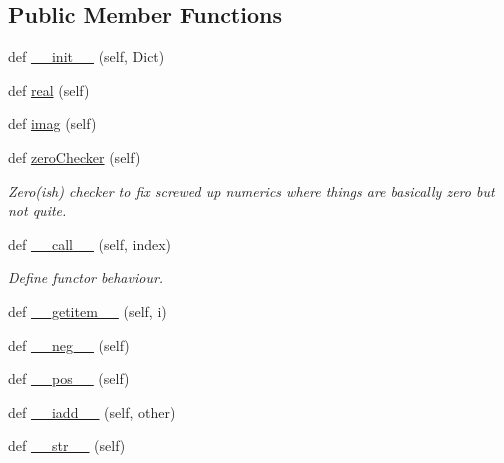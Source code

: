 \subsection*{Public Member Functions}
\begin{DoxyCompactItemize}
\item 
def \hyperlink{class_py_spinor_1_1pol_dictionary_1_1pol_dictionary_aa591099c2d162baef26e4c3a0f1d953e}{\+\_\+\+\_\+init\+\_\+\+\_\+} (self, Dict)
\item 
def \hyperlink{class_py_spinor_1_1pol_dictionary_1_1pol_dictionary_a42794ddf8460d756c5431d6700e7123b}{real} (self)
\item 
def \hyperlink{class_py_spinor_1_1pol_dictionary_1_1pol_dictionary_a704983b1069c410cebb66b83f5449c07}{imag} (self)
\item 
def \hyperlink{class_py_spinor_1_1pol_dictionary_1_1pol_dictionary_a892916dbb6cc54e0c365903e37abf3a9}{zero\+Checker} (self)
\begin{DoxyCompactList}\small\item\em Zero(ish) checker to fix screwed up numerics where things are basically zero but not quite. \end{DoxyCompactList}\item 
def \hyperlink{class_py_spinor_1_1pol_dictionary_1_1pol_dictionary_adccb979d3dcd442690a49ad3ba6e4e23}{\+\_\+\+\_\+call\+\_\+\+\_\+} (self, index)
\begin{DoxyCompactList}\small\item\em Define functor behaviour. \end{DoxyCompactList}\item 
def \hyperlink{class_py_spinor_1_1pol_dictionary_1_1pol_dictionary_a7575411d14bf8c5e4a2d58efe4d175b5}{\+\_\+\+\_\+getitem\+\_\+\+\_\+} (self, i)
\item 
def \hyperlink{class_py_spinor_1_1pol_dictionary_1_1pol_dictionary_ac1d4dc87c1027660422a4af2d46fd78f}{\+\_\+\+\_\+neg\+\_\+\+\_\+} (self)
\item 
def \hyperlink{class_py_spinor_1_1pol_dictionary_1_1pol_dictionary_a2fc7e0be7463d98e2510430261990f50}{\+\_\+\+\_\+pos\+\_\+\+\_\+} (self)
\item 
def \hyperlink{class_py_spinor_1_1pol_dictionary_1_1pol_dictionary_a2c44d12d920ba64d314e10d8827604bf}{\+\_\+\+\_\+iadd\+\_\+\+\_\+} (self, other)
\item 
def \hyperlink{class_py_spinor_1_1pol_dictionary_1_1pol_dictionary_ade193f2738984f6a3df528b64690435a}{\+\_\+\+\_\+str\+\_\+\+\_\+} (self)
\item 

\end{DoxyCompactItemize}
